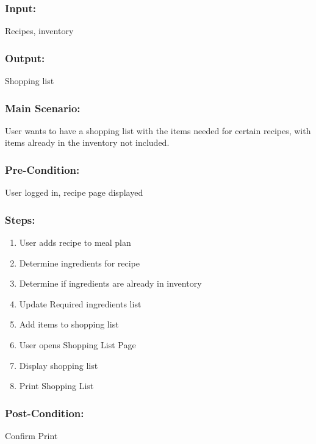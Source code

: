 		\subsubsection{Input:} Recipes, inventory
		\subsubsection{Output:} Shopping list
		\subsubsection{Main Scenario:} User wants to have a shopping list with the items needed for certain recipes, with items already in the inventory not included. 
		\subsubsection{Pre-Condition:} User logged in, recipe page displayed
		\subsubsection{Steps:} 
		\begin{enumerate}
			\item User adds recipe to meal plan
			\item Determine ingredients for recipe
			\item Determine if ingredients are already in inventory
			\item Update Required ingredients list
			\item Add items to shopping list
			\item User opens Shopping List Page
			\item Display shopping list
			\item Print Shopping List
		\end{enumerate}
		\subsubsection{Post-Condition:} Confirm Print
